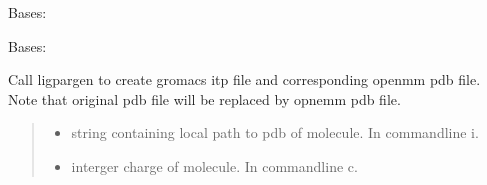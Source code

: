 \documentclass[letterpaper,10pt,english]{sphinxmanual}
\begin{document}
\begin{fulllineitems}
\label{\detokenize{protein:protein.Oligomer}}
\pysigstartsignatures
{}
\pysigstopsignatures
\sphinxAtStartPar
Bases: {\hyperref[\detokenize{protein:protein.Monomer}]{}}

\end{fulllineitems}


\begin{fulllineitems}
\label{\detokenize{protein:protein.CalculateLigandParameters}}
\pysigstartsignatures
{}
\pysigstopsignatures
\sphinxAtStartPar
Bases: 

\begin{fulllineitems}
\label{\detokenize{protein:protein.CalculateLigandParameters.create_itp}}
\pysigstartsignatures
{}
\pysigstopsignatures
\sphinxAtStartPar
Call ligpargen to create gromacs itp file and corresponding openmm
pdb file. Note that original pdb file will be replaced by opnemm pdb
file.
\begin{quote}\begin{description}
\begin{itemize}
\item {} 
\sphinxAtStartPar
{} \textendash{} string containing local path to pdb of molecule. In commandline \sphinxhyphen{}i.

\item {} 
\sphinxAtStartPar
{} \textendash{} interger charge of molecule. In commandline \sphinxhyphen{}c.


\end{itemize}
\end{description}
\end{quote}
\end{fulllineitems}
\end{fulllineitems}
\end{document}
